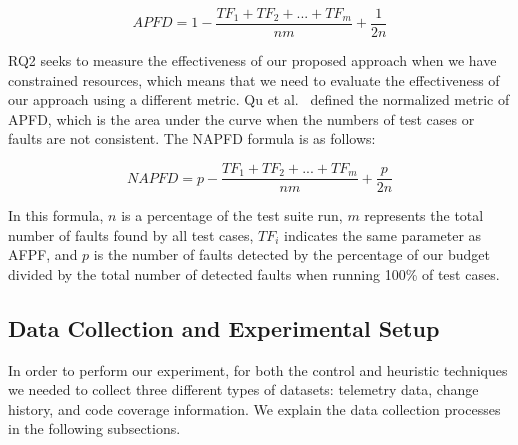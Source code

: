 \vspace*{-5pt}
\[
{APFD = 1- \frac {{TF_{1} + TF_{2} + ... + TF_{m}}} {nm} + \frac{1}{2n}}
\]
	
RQ2 seeks to measure the effectiveness of our proposed approach
when we have constrained resources, which means that we need to evaluate 
the effectiveness of our approach using a different metric. 
Qu et al.~\cite{myra} defined the normalized metric of APFD, which is the
area under the curve when the numbers of test cases or faults are not consistent. 
The NAPFD formula is as follows:
	
\vspace*{-5pt}
\[
{NAPFD = p- \frac {{TF_{1} + TF_{2} + ... + TF_{m}}} {nm} + \frac{p}{2n}}
\]
	
In this formula, $n$ is a percentage of the test suite run, 
$m$ represents the total number of faults found by all test cases,
$TF_{i}$ indicates the same parameter as AFPF, and 
$p$ is the number of faults detected by the percentage of our
budget divided by the total number of detected faults when 
running 100\% of test cases.  


\subsection{Data Collection and Experimental Setup}
\label{data-collection}
In order to perform our experiment, for both the control and heuristic techniques
we needed to collect three different types of datasets: telemetry data, change 
history, and code coverage information. We explain the data collection processes
in the following subsections.

